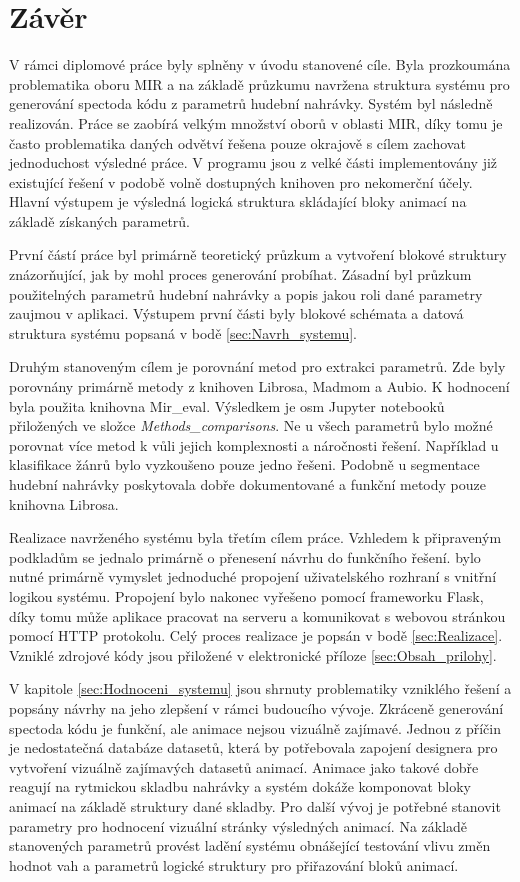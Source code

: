 \chapter*{Závěr}
{}

V rámci diplomové práce byly splněny v úvodu stanovené cíle. Byla prozkoumána problematika oboru \acs{MIR} a na základě průzkumu navržena struktura systému pro generování spectoda kódu z parametrů hudební nahrávky. Systém byl následně realizován. Práce se zaobírá velkým množství oborů v oblasti \acs{MIR}, díky tomu je často problematika daných odvětví řešena pouze okrajově s cílem zachovat jednoduchost výsledné práce. V programu jsou z velké části implementovány již existující řešení v podobě volně dostupných knihoven pro nekomerční účely. Hlavní výstupem je výsledná logická struktura skládající bloky animací na základě získaných parametrů. 

První částí práce byl primárně teoretický průzkum a vytvoření blokové struktury znázorňující, jak by mohl proces generování probíhat. Zásadní byl průzkum použitelných parametrů hudební nahrávky a popis jakou roli dané parametry zaujmou v aplikaci. Výstupem první části byly blokové schémata a datová struktura systému popsaná v bodě \ref{sec:Navrh_systemu}. 

Druhým stanoveným cílem je porovnání metod pro extrakci parametrů. Zde byly porovnány primárně metody z knihoven Librosa, Madmom a Aubio. K hodnocení byla použita knihovna Mir\_eval. Výsledkem je osm Jupyter notebooků přiložených ve složce \textit{Methods\_comparisons}. Ne u všech parametrů bylo možné porovnat více metod k vůli jejich komplexnosti a náročnosti řešení. Například u klasifikace žánrů bylo vyzkoušeno pouze jedno řešeni. Podobně u segmentace hudební nahrávky poskytovala dobře dokumentované a funkční metody pouze knihovna Librosa. 

Realizace navrženého systému byla třetím cílem práce. Vzhledem k připraveným podkladům se jednalo primárně o přenesení návrhu do funkčního řešení. bylo nutné primárně vymyslet jednoduché propojení uživatelského rozhraní s vnitřní logikou systému. Propojení bylo nakonec vyřešeno pomocí frameworku Flask, díky tomu může aplikace pracovat na serveru a komunikovat s webovou stránkou pomocí \acs{HTTP} protokolu. Celý proces realizace je popsán v bodě \ref{sec:Realizace}. Vzniklé zdrojové kódy jsou přiložené v elektronické příloze \ref{sec:Obsah_prilohy}. 

V kapitole \ref{sec:Hodnoceni_systemu} jsou shrnuty problematiky vzniklého řešení a popsány návrhy na jeho zlepšení v rámci budoucího vývoje. Zkráceně generování spectoda kódu je funkční, ale animace nejsou vizuálně zajímavé. Jednou z příčin je nedostatečná databáze datasetů, která by potřebovala zapojení designera pro vytvoření vizuálně zajímavých datasetů animací. Animace jako takové dobře reagují na rytmickou skladbu nahrávky a systém dokáže komponovat bloky animací na základě struktury dané skladby. Pro další vývoj je potřebné stanovit parametry pro hodnocení vizuální stránky výsledných animací. Na základě stanovených parametrů provést ladění systému obnášející testování vlivu změn hodnot vah a parametrů logické struktury pro přiřazování bloků animací. 